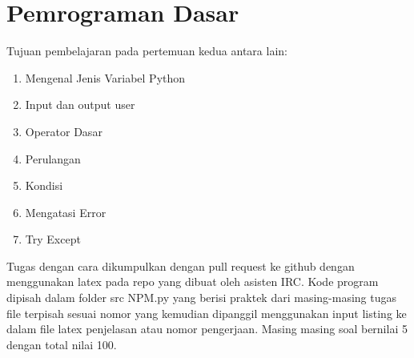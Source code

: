 \chapter{Pemrograman Dasar}
Tujuan pembelajaran pada pertemuan kedua antara lain:
\begin{enumerate}
\item
Mengenal Jenis Variabel Python
\item
Input dan output user
\item
Operator Dasar
\item
Perulangan
\item
Kondisi
\item
Mengatasi Error
\item
Try Except
\end{enumerate}
Tugas dengan cara dikumpulkan dengan pull request ke github dengan menggunakan latex pada repo yang dibuat oleh asisten IRC. Kode program dipisah dalam folder src NPM.py yang berisi praktek dari masing-masing tugas file terpisah sesuai nomor yang kemudian dipanggil menggunakan input listing ke dalam file latex penjelasan atau nomor pengerjaan. Masing masing soal bernilai 5 dengan total nilai 100.

